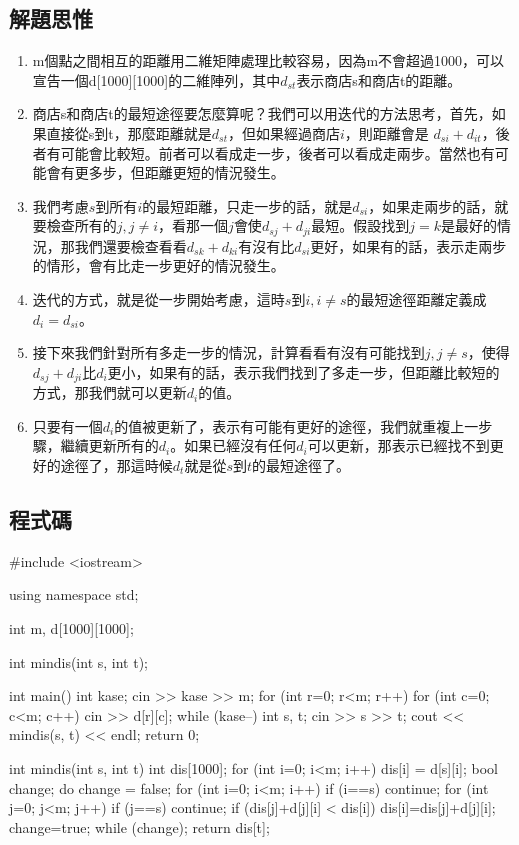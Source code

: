 \subsection{解題思惟}
\begin{enumerate}
	\item m個點之間相互的距離用二維矩陣處理比較容易，因為m不會超過1000，可以宣告一個d[1000][1000]的二維陣列，其中$d_{st}$表示商店s和商店t的距離。
	\item 商店s和商店t的最短途徑要怎麼算呢？我們可以用迭代的方法思考，首先，如果直接從s到t，那麼距離就是$d_{st}$，但如果經過商店$i$，則距離會是
	$d_{si}+d_{it}$，後者有可能會比較短。前者可以看成走一步，後者可以看成走兩步。當然也有可能會有更多步，但距離更短的情況發生。
	\item 我們考慮$s$到所有$i$的最短距離，只走一步的話，就是$d_{si}$，如果走兩步的話，就要檢查所有的$j, j\ne i$，看那一個$j$會使$d_{sj}+d_{ji}$最短。假設找到$j=k$是最好的情況，那我們還要檢查看看$d_{sk}+d_{ki}$有沒有比$d_{si}$更好，如果有的話，表示走兩步的情形，會有比走一步更好的情況發生。
	\item 迭代的方式，就是從一步開始考慮，這時$s$到$i, i\ne s$的最短途徑距離定義成$d_i = d_{si}$。
	\item 接下來我們針對所有多走一步的情況，計算看看有沒有可能找到$j, j\ne s$，使得$d_{sj}+d_{ji}$比$d_i$更小，如果有的話，表示我們找到了多走一步，但距離比較短的方式，那我們就可以更新$d_i$的值。
	\item 只要有一個$d_i$的值被更新了，表示有可能有更好的途徑，我們就重複上一步驟，繼續更新所有的$d_i$。如果已經沒有任何$d_i$可以更新，那表示已經找不到更好的途徑了，那這時候$d_t$就是從$s$到$t$的最短途徑了。
\end{enumerate}

\subsection{程式碼}
\begin{cppcode}
#include <iostream>

using namespace std;

int m, d[1000][1000];

int mindis(int s, int t);

int main()
{
	int kase;
	cin >> kase >> m;
	for (int r=0; r<m; r++) for (int c=0; c<m; c++) cin >> d[r][c];
	while (kase--) {
		int s, t;
		cin >> s >> t;
		cout << mindis(s, t) << endl;
	}
	return 0;
}

int mindis(int s, int t)
{
	int dis[1000];
	for (int i=0; i<m; i++) dis[i] = d[s][i];
	bool change;
	do {
		change = false;
		for (int i=0; i<m; i++) {
			if (i==s) continue;
			for (int j=0; j<m; j++) {
				if (j==s) continue;
				if (dis[j]+d[j][i] < dis[i]) { dis[i]=dis[j]+d[j][i]; change=true; }
			}
		}
	} while (change);
	return dis[t];
}
\end{cppcode}